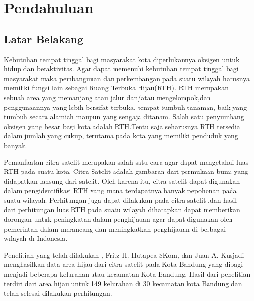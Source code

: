 \chapter{Pendahuluan}
\label{chap:intro}
   
\section{Latar Belakang}
\label{sec:label}


Kebutuhan tempat tinggal bagi masyarakat kota diperlukannya oksigen untuk hidup dan beraktivitas. Agar dapat memenuhi kebutuhan tempat tinggal bagi masyarakat maka pembangunan dan perkembangan pada suatu wilayah harusnya memiliki fungsi lain sebagai Ruang Terbuka Hijau(RTH). RTH merupakan sebuah area yang memanjang atau jalur dan/atau mengelompok,dan penggunaannya yang lebih bersifat terbuka, tempat tumbuh tanaman, baik yang tumbuh secara alamiah maupun yang sengaja ditanam. Salah satu penyumbang oksigen yang besar bagi kota adalah RTH.Tentu saja seharusnya RTH tersedia dalam jumlah yang cukup, terutama pada kota yang memiliki penduduk yang banyak.

Pemanfaatan citra satelit merupakan salah satu cara agar dapat mengetahui luas RTH pada suatu kota. Citra Satelit adalah gambaran dari permukaan bumi yang didapatkan lansung dari satelit. Oleh karena itu, citra satelit dapat digunakan dalam pengidentifikasi RTH yang mana terdapatnya banyak pepohonan pada suatu wilayah. Perhitungan juga dapat dilakukan pada citra satelit ,dan hasil dari perhitungan luas RTH pada suatu wilayah diharapkan dapat memberikan dorongan untuk peningkatan dalam penghijauan agar dapat digunakan oleh pemerintah dalam merancang dan meningkatkan penghijauan di berbagai wilayah di Indonesia.

Penelitian yang telah dilakukan \VSM, Fritz H. Hutapea SKom, dan Juan A. Kusjadi
menghasilkan data area hijau dari citra satelit pada Kota Bandung yang dibagi menjadi beberapa kelurahan atau kecamatan Kota Bandung. Hasil dari penelitian terdiri dari area hijau untuk 149 kelurahan di 30 kecamatan kota Bandung dan telah selesai dilakukan perhitungan.

